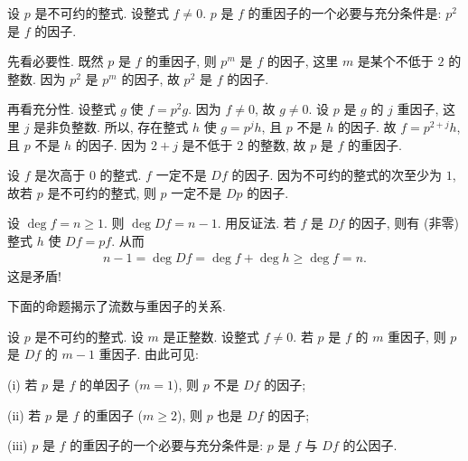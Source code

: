 \begin{proposition}
    设 $p$ 是不可约的整式. 设整式 $f \neq 0$. $p$ 是 $f$ 的重因子的一个必要与充分条件是: $p^2$ 是 $f$ 的因子.
\end{proposition}

\begin{pf}
    先看必要性. 既然 $p$ 是 $f$ 的重因子, 则 $p^m$ 是 $f$ 的因子, 这里 $m$ 是某个不低于 $2$ 的整数. 因为 $p^2$ 是 $p^m$ 的因子, 故 $p^2$ 是 $f$ 的因子.

    再看充分性. 设整式 $g$ 使 $f = p^2 g$. 因为 $f \neq 0$, 故 $g \neq 0$. 设 $p$ 是 $g$ 的 $j$ 重因子, 这里 $j$ 是非负整数. 所以, 存在整式 $h$ 使 $g = p^j h$, 且 $p$ 不是 $h$ 的因子. 故 $f = p^{2+j} h$, 且 $p$ 不是 $h$ 的因子. 因为 $2+j$ 是不低于 $2$ 的整数, 故 $p$ 是 $f$ 的重因子.
\end{pf}

\begin{proposition}
    设 $f$ 是次高于 $0$ 的整式. $f$ 一定不是 $Df$ 的因子. 因为不可约的整式的次至少为 $1$, 故若 $p$ 是不可约的整式, 则 $p$ 一定不是 $Dp$ 的因子.
\end{proposition}

\begin{pf}
    设 $\deg f = n \geq 1$. 则 $\deg Df = n - 1$. 用反证法. 若 $f$ 是 $Df$ 的因子, 则有 (非零) 整式 $h$ 使 $Df = pf$. 从而
    \begin{align*}
        n - 1 = \deg Df = \deg f + \deg h \geq \deg f = n.
    \end{align*}
    这是矛盾!
\end{pf}

下面的命题揭示了流数与重因子的关系.

\begin{proposition}
    设 $p$ 是不可约的整式. 设 $m$ 是正整数. 设整式 $f \neq 0$. 若 $p$ 是 $f$ 的 $m$ 重因子, 则 $p$ 是 $Df$ 的 $m-1$ 重因子. 由此可见:

    (i) 若 $p$ 是 $f$ 的单因子 ($m = 1$), 则 $p$ 不是 $Df$ 的因子;

    (ii) 若 $p$ 是 $f$ 的重因子 ($m \geq 2$), 则 $p$ 也是 $Df$ 的因子;

    (iii) $p$ 是 $f$ 的重因子的一个必要与充分条件是: $p$ 是 $f$ 与 $Df$ 的公因子.
\end{proposition}

